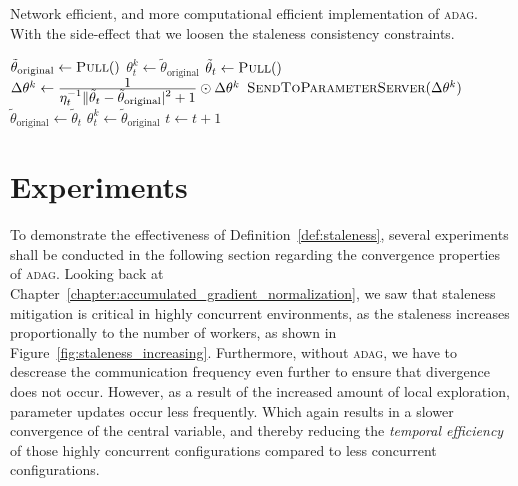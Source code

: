 \begin{algorithm}[H]
  \caption{Network efficient, and more computational efficient implementation of \textsc{adag}. With the side-effect that we loosen the staleness consistency constraints.}
  \label{algo:adag_2}
  \begin{algorithmic}[1]
    \State $\tilde{\theta}_\text{original} \gets \Call{Pull}$ 
    \State $\theta^k_t \gets \tilde{\theta}_\text{original}$
    \State
     
    \State $\tilde{\theta}_t \gets \Call{Pull}$
    \State $\Delta\theta^k \gets \frac{\displaystyle 1}{\displaystyle \eta_t^{-1}\|\tilde{\theta}_t - \tilde{\theta}_\text{original}|^2 + 1} \odot \Delta\theta^k$
    \State $\Call{SendToParameterServer}{\Delta\theta^k}$
    \State $\tilde{\theta}_\text{original} \gets \tilde{\theta}_t$
    \State $\theta^k_t \gets \tilde{\theta}_\text{original}$
    \State $t \gets t + 1$
    \EndProcedure
    \State
    \EndProcedure
  \end{algorithmic}
\end{algorithm}

\section{Experiments}
\label{sec:adag_experiments}

To demonstrate the effectiveness of Definition~\ref{def:staleness}, several experiments shall be conducted in the following section regarding the convergence properties of \textsc{adag}. Looking back at Chapter~\ref{chapter:accumulated_gradient_normalization}, we saw that staleness mitigation is critical in highly concurrent environments, as the staleness increases proportionally to the number of workers, as shown in Figure~\ref{fig:staleness_increasing}. Furthermore, without \textsc{adag}, we have to descrease the communication frequency even further to ensure that divergence does not occur. However, as a result of the increased amount of local exploration, parameter updates occur less frequently. Which again results in a slower convergence of the central variable, and thereby reducing the \emph{temporal efficiency} of those highly concurrent configurations compared to less concurrent configurations.\\

